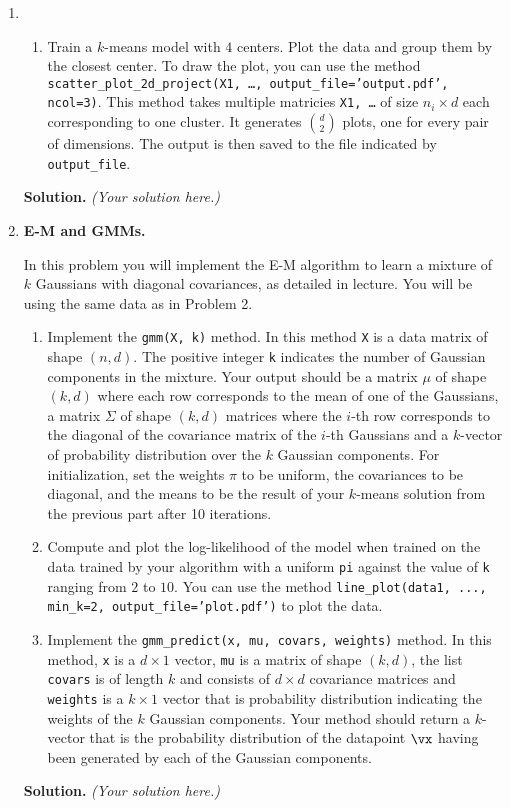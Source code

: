 \documentclass{article}
\theoremstyle{definition}
\theoremstyle{remark}
\newenvironment{Q}
{%
\clearpage
\item
}
{%
\phantom{s}
\bigskip
\textbf{Solution.}
\emph{(Your solution here.)}
}
\begin{document}
\begin{enumerate}
\begin{Q}
\begin{enumerate}
    \item
      Train a $k$-means model with $4$ centers. Plot the data and group them by the closest center. To draw the plot, you can use the method \texttt{scatter\_plot\_2d\_project(X1, \ldots, output\_file='output.pdf', ncol=3)}. This method takes multiple matricies \texttt{X1, \ldots} of size $n_i \times d$ each corresponding to one cluster. It generates ${d \choose 2}$ plots, one for every pair of dimensions. The output is then saved to the file indicated by \texttt{output\_file}.
  \end{enumerate}
\end{Q}

\begin{Q}
  \textbf{E-M and GMMs.}

  In this problem you will implement the E-M algorithm to learn a mixture of $k$ Gaussians with diagonal covariances, as detailed in lecture. You will be using the same data as in Problem 2.

  \begin{enumerate}
    \item
      Implement the \texttt{gmm(X, k)} method. In this method \texttt{X} is a data matrix of shape $(n,d)$. The positive integer \texttt{k} indicates the number of Gaussian components in the mixture. Your output should be a matrix $\mu$ of shape $(k,d)$ where each row corresponds to the mean of one of the Gaussians, a matrix $\Sigma$ of shape $(k,d)$ matrices where the $i$-th row corresponds to the diagonal of the covariance matrix of the $i$-th Gaussians and a $k$-vector of probability distribution over the $k$ Gaussian components.  For initialization, set the weights $\pi$ to be uniform, the covariances to be diagonal, and the means to be the result of your $k$-means solution from the previous part after 10 iterations.

    \item
      Compute and plot the log-likelihood of the model when trained on the data trained by your algorithm with a uniform \texttt{pi} against the value of \texttt{k} ranging from $2$ to $10$. You can use the method \texttt{line\_plot(data1, ..., min\_k=2, output\_file='plot.pdf')} to plot the data.

    \item
      Implement the \texttt{gmm\_predict(x, mu, covars, weights)} method. In this method, \texttt{x} is a $d \times 1$ vector, \texttt{mu} is a matrix of shape $(k,d)$, the list \texttt{covars} is of length $k$ and consists of $d \times d$ covariance matrices and \texttt{weights} is a $k \times 1$ vector that is probability distribution indicating the weights of the $k$ Gaussian components. Your method should return a $k$-vector that is the probability distribution of the datapoint $\vx$ having been generated by each of the Gaussian components.


\end{enumerate}
\end{Q}
\end{enumerate}
\end{document}
